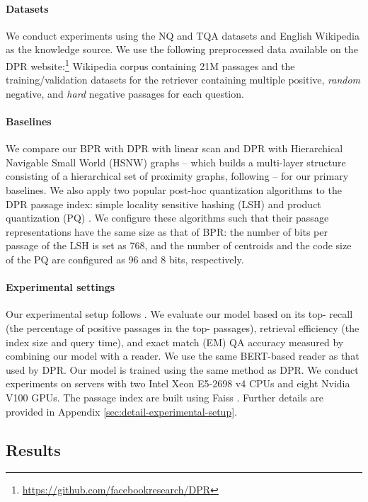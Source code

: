 \documentclass[11pt,a4paper]{article}
\begin{document}
\paragraph{Datasets}
We conduct experiments using the NQ and TQA datasets and English Wikipedia as the knowledge source.
We use the following preprocessed data available on the DPR website:\footnote{\url{https://github.com/facebookresearch/DPR}} Wikipedia corpus containing 21M passages and the training/validation datasets for the retriever containing multiple positive, \textit{random} negative, and \textit{hard} negative passages for each question.

\paragraph{Baselines}
We compare our BPR with DPR with linear scan and DPR with Hierarchical Navigable Small World (HSNW) graphs \cite{Malkov2020EfficientGraphs} -- which builds a multi-layer structure consisting of a hierarchical set of proximity graphs, following \citet{Karpukhin2020DenseAnswering} -- for our primary baselines.
We also apply two popular post-hoc quantization algorithms to the DPR passage index: simple locality sensitive hashing (LSH) \cite{Neyshabur2015OnSearch} and product quantization (PQ) \cite{Jegou2011ProductSearch}.
We configure these algorithms such that their passage representations have the same size as that of BPR: the number of bits per passage of the LSH is set as 768, and the number of centroids and the code size of the PQ are configured as 96 and 8 bits, respectively.

\paragraph{Experimental settings}
Our experimental setup follows \citet{Karpukhin2020DenseAnswering}.
We evaluate our model based on its top- recall (the percentage of positive passages in the top- passages), retrieval efficiency (the index size and query time), and exact match (EM) QA accuracy measured by combining our model with a reader.
We use the same BERT-based reader as that used by DPR.
Our model is trained using the same method as DPR.
We conduct experiments on servers with two Intel Xeon E5-2698 v4 CPUs and eight Nvidia V100 GPUs.
The passage index are built using Faiss \cite{Johnson2019Billion-scaleGPUs}.
Further details are provided in Appendix \ref{sec:detail-experimental-setup}.

\subsection{Results}
\end{document}
